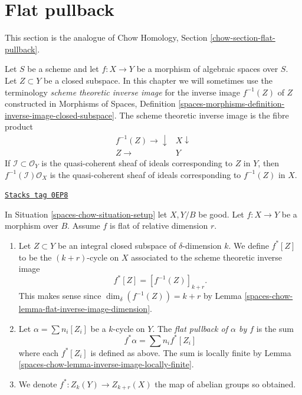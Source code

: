 \section{Flat pullback}
\label{spaces-chow-section-flat-pullback}
This section is the analogue of
Chow Homology, Section \ref{chow-section-flat-pullback}.

\medskip\noindent
Let $S$ be a scheme and let $f : X \to Y$ be a morphism of algebraic
spaces over $S$. Let $Z \subset Y$ be a closed subspace.
In this chapter we will sometimes use the terminology
{\it scheme theoretic inverse image} for the inverse image
$f^{-1}(Z)$ of $Z$ constructed in Morphisms of Spaces, Definition
\ref{spaces-morphisms-definition-inverse-image-closed-subspace}.
The scheme theoretic inverse image is the fibre product
$$
\begin{array}{cc}f^{-1}(Z) \longrightarrow\downarrow & X \downarrow \\ Z \longrightarrow & Y\end{array}
$$
If $\mathcal{I} \subset \mathcal{O}_Y$ is the quasi-coherent sheaf of ideals
corresponding to $Z$ in $Y$, then $f^{-1}(\mathcal{I})\mathcal{O}_X$ is the
quasi-coherent sheaf of ideals corresponding to $f^{-1}(Z)$ in $X$.

\begin{definition}
\label{spaces-chow-definition-flat-pullback}
\href{https://stacks.math.columbia.edu/tag/0EP8}{\texttt{Stacks tag 0EP8}}

In Situation \ref{spaces-chow-situation-setup} let $X, Y/B$ be good.
Let $f : X \to Y$ be a morphism over $B$.
Assume $f$ is flat of relative dimension $r$.
\begin{enumerate}
\item Let $Z \subset Y$ be an integral closed subspace of
$\delta$-dimension $k$. We define $f^*[Z]$ to be the
$(k+r)$-cycle on $X$ associated to the scheme theoretic inverse image
$$
f^*[Z] = [f^{-1}(Z)]_{k+r}.
$$
This makes sense since $\dim_\delta(f^{-1}(Z)) = k + r$
by Lemma \ref{spaces-chow-lemma-flat-inverse-image-dimension}.
\item Let $\alpha = \sum n_i [Z_i]$ be
a $k$-cycle on $Y$. The {\it flat pullback of $\alpha$ by $f$}
is the sum
$$
f^* \alpha = \sum n_i f^*[Z_i]
$$
where each $f^*[Z_i]$ is defined as above.
The sum is locally finite by Lemma \ref{spaces-chow-lemma-inverse-image-locally-finite}.
\item We denote $f^* : Z_k(Y) \to Z_{k + r}(X)$ the map of abelian
groups so obtained.
\end{enumerate}
\end{definition}

